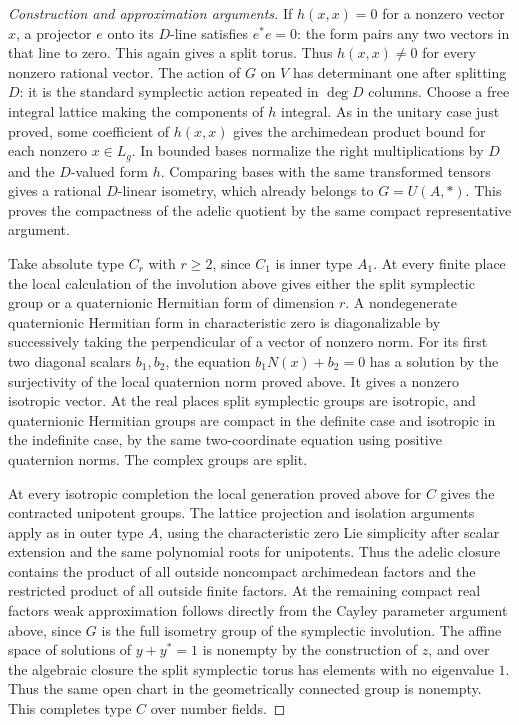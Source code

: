 \documentclass[11pt,a4paper,openany,oneside]{book}
\theoremstyle{resultstyle}
\theoremstyle{definition}
\numberwithin{equation}{chapter}
\begin{document}
\begin{proof}[Construction and approximation arguments]
If \(h(x,x)=0\) for a nonzero vector \(x\), a projector
\(e\) onto its \(D\)-line satisfies \(e^\ast e=0\):
the form pairs any two vectors in that line to zero.
This again gives a split torus. Thus \(h(x,x)\ne0\)
for every nonzero rational vector. The action of \(G\)
on \(V\) has determinant one after splitting \(D\):
it is the standard symplectic action repeated in
\(\deg D\) columns. Choose a free integral lattice
making the components of \(h\) integral. As in the
unitary case just proved, some coefficient of
\(h(x,x)\) gives the archimedean product bound for
each nonzero \(x\in L_g\). In bounded bases normalize
the right multiplications by \(D\) and the \(D\)-valued
form \(h\). Comparing bases with the same transformed
tensors gives a rational \(D\)-linear isometry, which
already belongs to \(G=U(A,\ast)\). This proves the
compactness of the adelic quotient by the same
compact representative argument.

Take absolute type \(C_r\) with \(r\geq2\), since
\(C_1\) is inner type \(A_1\). At every finite place
the local calculation of the involution above gives
either the split symplectic group or a quaternionic
Hermitian form of dimension \(r\).
A nondegenerate quaternionic Hermitian form in
characteristic zero is diagonalizable by successively
taking the perpendicular of a vector of nonzero norm.
For its first two diagonal scalars \(b_1,b_2\),
the equation \(b_1 N(x)+b_2=0\) has a solution
by the surjectivity of the local quaternion norm
proved above. It gives a nonzero isotropic vector.
At the real places split symplectic groups are
isotropic, and quaternionic Hermitian groups are
compact in the definite case and isotropic in the
indefinite case, by the same two-coordinate equation
using positive quaternion norms. The complex groups
are split.

At every isotropic completion the local generation
proved above for \(C\) gives the contracted unipotent
groups. The lattice projection and isolation arguments
apply as in outer type \(A\), using the characteristic
zero Lie simplicity after scalar extension and the
same polynomial roots for unipotents. Thus the adelic
closure contains the product of all outside noncompact
archimedean factors and the restricted product of all
outside finite factors. At the remaining compact real
factors weak approximation follows directly from the
Cayley parameter argument above, since \(G\) is the
full isometry group of the symplectic involution. The
affine space of solutions of \(y+y^\ast=1\) is nonempty
by the construction of \(z\), and over the algebraic
closure the split symplectic torus has elements with
no eigenvalue \(1\). Thus the same open chart in the
geometrically connected group is nonempty.
This completes type \(C\) over number fields.


\end{proof}
\end{document}
